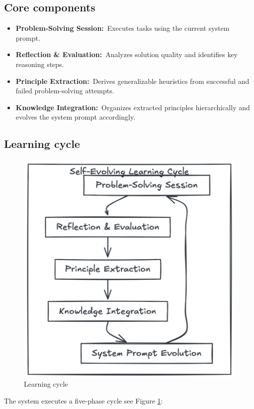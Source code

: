 \documentclass[10pt,a4paper,twocolumn]{article}
\begin{document}
\subsection{Core components}


\begin{itemize}
    \item \textbf{Problem-Solving Session:} Executes tasks using the current system prompt.
    \item \textbf{Reflection \& Evaluation:} Analyzes solution quality and identifies key reasoning steps.
    \item \textbf{Principle Extraction:} Derives generalizable heuristics from successful and failed problem-solving attempts.
    \item \textbf{Knowledge Integration:} Organizes extracted principles hierarchically and evolves the system prompt accordingly.
\end{itemize}



\subsection{Learning cycle}

\begin{figure}
    \centering
    \includegraphics[width=0.75\linewidth]{learning_cycle.png}
    \caption{Learning cycle}
    \label{fig:cycle}
\end{figure}


 The system executes a five-phase cycle see Figure \ref{fig:cycle}:
\end{document}

